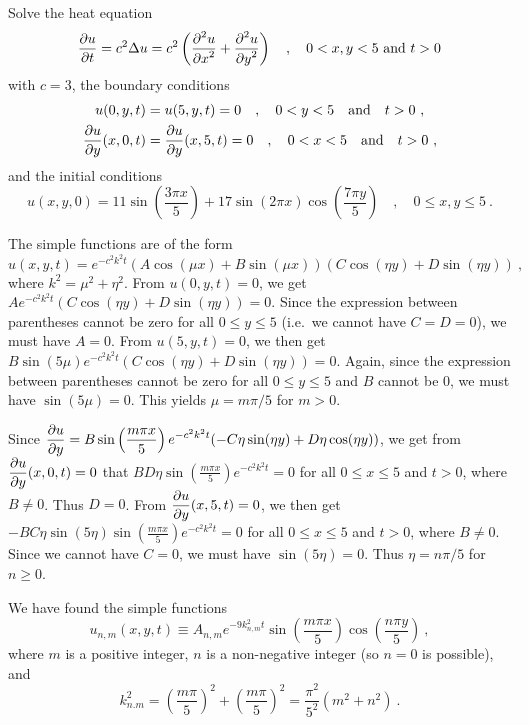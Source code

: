 \begin{egg}
Solve the heat equation
\[
\frac{\partial{u}}{\partial t} = c^2 \Delta u = c^2 \left( \frac{\displaystyle \partial^{2}{u}} {\displaystyle \partial x^{2}} +
\frac{\displaystyle \partial^{2}{u}} {\displaystyle \partial y^{2}} \right) \quad ,
\quad 0<x , y<5 \ \text{and} \ t>0
\]
with $c=3$, the boundary conditions
\begin{align*}
u(0,y,t) &= u(5,y,t) = 0 \quad , \quad 0<y<5 \quad \text{and}
\quad t>0 \ , \\
\frac{\partial{u}}{\partial y}(x,0,t) &= \frac{\partial{u}}{\partial y}(x,5,t) = 0 \quad , \quad
0<x<5 \quad \text{and} \quad t>0 \ ,
\end{align*}
and the initial conditions
\[
u(x,y,0) = 11 \sin\left(\frac{3\pi x}{5}\right) + 17 \sin\left(2\pi x\right)
\cos\left(\frac{7\pi y }{5}\right) \quad , \quad
0\leq x, y \leq 5 \ .
\]

The simple functions are of the form
\[
u(x,y,t) = e^{-c^2 k^2 t}(A \cos (\mu x) + B \sin (\mu x))
(C \cos (\eta y) + D \sin (\eta y)) \ ,
\]
where $k^2 = \mu^2 + \eta^2$.
From $u(0,y,t) = 0$, we get
$\displaystyle A e^{-c^2 k^2 t} (C \cos (\eta y) + D \sin (\eta y)) = 0$.
Since the expression between parentheses cannot be zero
for all $0 \leq y \leq 5$ (i.e.\ we cannot have $C=D=0$), we must have
$A=0$.  From $u(5,y,t) = 0$, we then get
$\displaystyle
B \sin(5\mu) e^{-c^2 k^2 t} (C \cos (\eta y) + D \sin (\eta y)) =0$.
Again, since the expression between parentheses cannot be zero for all
$0 \leq y \leq 5$ and $B$ cannot be $0$, we must have $\sin(5\mu) = 0$.  This
yields $\mu = m\pi/5$ for $m >0$.

Since 
$\displaystyle \frac{\partial{u}}{\partial y} = B \sin\left(\frac{m\pi x}{5}\right) e^{-c^2 k^2 t}
(-C \eta \sin (\eta y) + D \eta \cos (\eta y))$,
we get from $\displaystyle \frac{\partial{u}}{\partial y}(x,0,t) = 0$ that
$\displaystyle B D \eta \sin\left(\frac{m\pi x}{5}\right) e^{-c^2 k^2 t} = 0$
for all $0 \leq x \leq 5$ and $t>0$, where $B\neq 0$.  Thus $D=0$.  From
$\displaystyle \frac{\partial{u}}{\partial y}(x,5,t) = 0$, we then get
$\displaystyle
-B C \eta \sin(5\eta)\sin\left(\frac{m\pi x}{5}\right) e^{-c^2 k^2 t} = 0$
for all $0 \leq x \leq 5$ and $t>0$, where $B\neq 0$.  Since we cannot have
$C=0$, we must have $\sin(5\eta) = 0$.  Thus $\eta = n \pi/5$ for
$n \geq 0$.

We have found the simple functions
\[
u_{n,m}(x,y,t) \equiv A_{n,m} e^{-9 k_{n,m}^2 t} \sin\left(\frac{m\pi x}{5}\right)
\cos\left(\frac{n\pi y}{5}\right) \ ,
\]
where $m$ is a positive integer, $n$ is a non-negative integer (so
$n=0$ is possible), and
\[
k_{n.m}^2 = \left(\frac{m \pi}{5}\right)^2 + \left(\frac{m \pi}{5}\right)^2
= \frac{\pi^2}{5^2} \left(m^2+n^2\right) \ .
\]


\end{egg}
